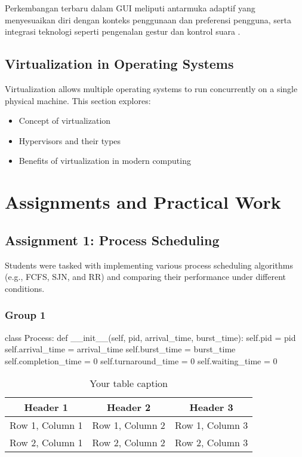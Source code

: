 \documentclass[12pt]{article}
\begin{document}
		Perkembangan terbaru dalam GUI meliputi antarmuka adaptif yang menyesuaikan diri dengan konteks penggunaan dan preferensi pengguna, serta integrasi teknologi seperti pengenalan gestur dan kontrol suara \cite{Murad2021}.

\subsection{Virtualization in Operating Systems}
Virtualization allows multiple operating systems to run concurrently on a single physical machine. This section explores:
\begin{itemize}
    \item Concept of virtualization
    \item Hypervisors and their types
    \item Benefits of virtualization in modern computing
\end{itemize}

\section{Assignments and Practical Work}
\subsection{Assignment 1: Process Scheduling}
Students were tasked with implementing various process scheduling algorithms (e.g., FCFS, SJN, and RR) and comparing their performance under different conditions.
\subsubsection{Group 1}
\begin{python}
    class Process:
    def __init__(self, pid, arrival_time, burst_time):
        self.pid = pid
        self.arrival_time = arrival_time
        self.burst_time = burst_time
        self.completion_time = 0
        self.turnaround_time = 0
        self.waiting_time = 0
\end{python}

\begin{table}[htbp] %
    \centering
    \begin{tabular}{|c|c|c|} %
    \hline
    Header 1 & Header 2 & Header 3 \\ %
    \hline
    Row 1, Column 1 & Row 1, Column 2 & Row 1, Column 3 \\ %
    \hline
    Row 2, Column 1 & Row 2, Column 2 & Row 2, Column 3 \\ %
    \hline
    \end{tabular}
    \caption{Your table caption} %
    \label{tab:your_label} %
\end{table}
\end{document}

